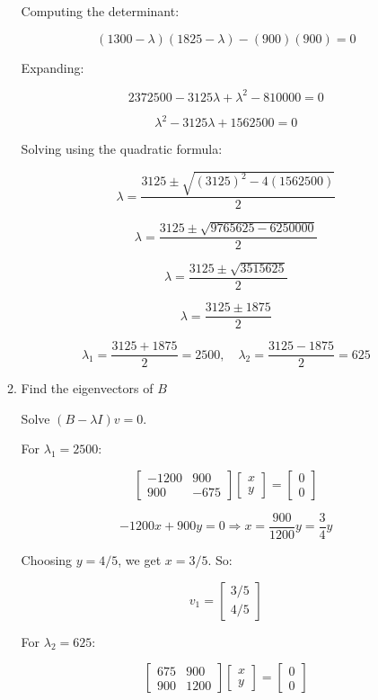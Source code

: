 \documentclass[12pt]{article}
\begin{document}
\begin{enumerate}
\begin{enumerate}
    Computing the determinant:

    \[
    (1300 - \lambda)(1825 - \lambda) - (900)(900) = 0
    \]

    Expanding:

    \[
    2372500 - 3125\lambda + \lambda^2 - 810000 = 0
    \]

    \[
    \lambda^2 - 3125\lambda + 1562500 = 0
    \]

    Solving using the quadratic formula:

    \[
    \lambda = \frac{3125 \pm \sqrt{(3125)^2 - 4(1562500)}}{2}
    \]

    \[
    \lambda = \frac{3125 \pm \sqrt{9765625 - 6250000}}{2}
    \]

    \[
    \lambda = \frac{3125 \pm \sqrt{3515625}}{2}
    \]

    \[
    \lambda = \frac{3125 \pm 1875}{2}
    \]

    \[
    \lambda_1 = \frac{3125 + 1875}{2} = 2500, \quad \lambda_2 = \frac{3125 - 1875}{2} = 625
    \]

    \item Find the eigenvectors of \( B \)

    Solve \( (B - \lambda I)v = 0 \).

    For \( \lambda_1 = 2500 \):

    \[
    \begin{bmatrix}
    -1200 & 900 \\
    900 & -675
    \end{bmatrix}
    \begin{bmatrix}
    x \\ y
    \end{bmatrix}
    =
    \begin{bmatrix}
    0 \\ 0
    \end{bmatrix}
    \]

    \[
    -1200x + 900y = 0 \Rightarrow x = \frac{900}{1200} y = \frac{3}{4} y
    \]

    Choosing \( y = 4/5 \), we get \( x = 3/5 \). So:

    \[
    v_1 =
    \begin{bmatrix}
    3/5 \\ 4/5
    \end{bmatrix}
    \]

    For \( \lambda_2 = 625 \):

    \[
    \begin{bmatrix}
    675 & 900 \\
    900 & 1200
    \end{bmatrix}
    \begin{bmatrix}
    x \\ y
    \end{bmatrix}
    =
    \begin{bmatrix}
    0 \\ 0
    \end{bmatrix}
    \]


\end{enumerate}
\end{enumerate}
\end{document}
